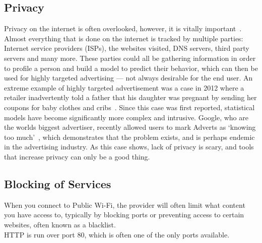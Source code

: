 \subsection{Privacy}
Privacy on the internet is often overlooked, however, it is vitally important~\cite{privacyrulez}. Almost everything that is done on the internet is tracked by multiple parties: Internet service providers (ISPs), the websites visited, DNS servers, third party servers and many more. These parties could all be gathering information in order to profile a person and build a model to predict their behavior, which can then be used for highly targeted advertising --- not always desirable for the end user. An extreme example of highly targeted advertisement was a case in 2012 where a retailer inadvertently told a father that his daughter was pregnant by sending her coupons for baby clothes and cribs~\cite{babyshower}.
Since this case was first reported, statistical models have become significantly more complex and intrusive. Google, who are the worlds biggest advertiser, recently allowed users to mark Adverts as `knowing too much'~\cite{googlearewatching}, which demonstrates that the problem exists, and is perhaps endemic in the advertising industry.
As this case shows, lack of privacy is scary, and tools that increase privacy can only be a good thing.

\subsection{Blocking of Services}
When you connect to Public Wi-Fi, the provider will often limit what content you have access to, typically by blocking ports or preventing access to certain websites, often known as a blacklist.\\
HTTP is run over port 80, which is often one of the only ports available.

